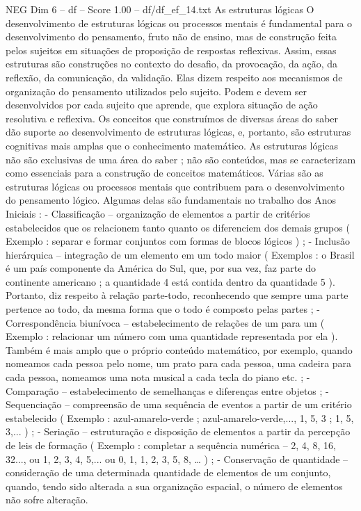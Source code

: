 \begin{textsample}{NEG Dim 6 – df – Score 1.00 – df/df\_ef\_14.txt}  \label{ex:f6_neg_166}
As estruturas lógicas O desenvolvimento de estruturas lógicas ou processos mentais é fundamental para o desenvolvimento do pensamento, fruto não de ensino, mas de construção feita pelos sujeitos em situações de proposição de respostas reflexivas.
Assim, essas estruturas são construções no contexto do desafio, da provocação, da ação, da reflexão, da comunicação, da validação.
Elas dizem respeito aos mecanismos de organização do pensamento utilizados pelo sujeito.
Podem e devem ser desenvolvidos por cada sujeito que aprende, que explora situação de ação resolutiva e reflexiva.
Os conceitos que construímos de diversas áreas do saber dão suporte ao desenvolvimento de estruturas lógicas, e, portanto, são estruturas cognitivas mais amplas que o conhecimento matemático.
As estruturas lógicas não são exclusivas de uma área do saber ; não são conteúdos, mas se caracterizam como essenciais para a construção de conceitos matemáticos.
Várias são as estruturas lógicas ou processos mentais que contribuem para o desenvolvimento do pensamento lógico.
Algumas delas são fundamentais no trabalho dos Anos Iniciais : - Classificação – organização de elementos a partir de critérios estabelecidos que os relacionem tanto quanto os diferenciem dos demais grupos ( Exemplo : separar e formar conjuntos com formas de blocos lógicos ) ; - Inclusão hierárquica – integração de um elemento em um todo maior ( Exemplos : o Brasil é um país componente da América do Sul, que, por sua vez, faz parte do continente americano ; a quantidade 4 está contida dentro da quantidade 5 ).
Portanto, diz respeito à relação parte-todo, reconhecendo que sempre uma parte pertence ao todo, da mesma forma que o todo é composto pelas partes ; - Correspondência biunívoca – estabelecimento de relações de um para um ( Exemplo : relacionar um número com uma quantidade representada por ela ).
Também é mais amplo que o próprio conteúdo matemático, por exemplo, quando nomeamos cada pessoa pelo nome, um prato para cada pessoa, uma cadeira para cada pessoa, nomeamos uma nota musical a cada tecla do piano etc. ; - Comparação – estabelecimento de semelhanças e diferenças entre objetos ; - Sequenciação – compreensão de uma sequência de eventos a partir de um critério estabelecido ( Exemplo : azul-amarelo-verde ; azul-amarelo-verde,..., 1, 5, 3 ; 1, 5, 3,... ) ; - Seriação – estruturação e disposição de elementos a partir da percepção de leis de formação ( Exemplo : completar a sequência numérica – 2, 4, 8, 16, 32..., ou 1, 2, 3, 4, 5,... ou 0, 1, 1, 2, 3, 5, 8, … ) ; - Conservação de quantidade – consideração de uma determinada quantidade de elementos de um conjunto, quando, tendo sido alterada a sua organização espacial, o número de elementos não sofre alteração.

\end{textsample}
